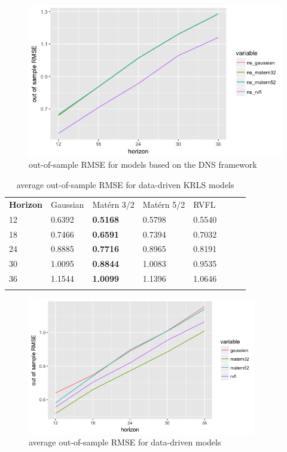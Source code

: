 \begin{figure}[!htb]
\centering
\includegraphics[width=12cm]{gfx/chapter-bayesianrvfl/oos_ns_krls.png}
\caption{out-of-sample RMSE for models based on the DNS framework}
\label{oos_ns_krls}
\end{figure}

\begin{table}[!htb]
\begin{center}
\caption{average out-of-sample RMSE for data-driven KRLS models}
\label{tab:min_value_no_ns}       %
\begin{tabular}{llllllll}
\hline\noalign{\smallskip}
\textbf{Horizon} & Gaussian & Mat\'ern 3/2  & Mat\'ern 5/2 & RVFL  \\
\noalign{\smallskip}\hline\noalign{\smallskip}
 12 & 0.6392 & \textbf{0.5168} & 0.5798 & 0.5540 \\
 18 & 0.7466 & \textbf{0.6591} & 0.7394 & 0.7032 \\
 24 & 0.8885 & \textbf{0.7716} & 0.8965 & 0.8191  \\
 30 & 1.0095 & \textbf{0.8844} & 1.0083 & 0.9535  \\
 36 & 1.1544 & \textbf{1.0099} & 1.1396 & 1.0646 \\
 \noalign{\smallskip}\hline
\end{tabular}
\end{center}
\end{table}

\newpage

\begin{figure}[!htb]
\centering
\includegraphics[width=10cm]{gfx/chapter-bayesianrvfl/oos_krls.png}
\caption{average out-of-sample RMSE for data-driven models}
\label{oos_krls}
\end{figure}

